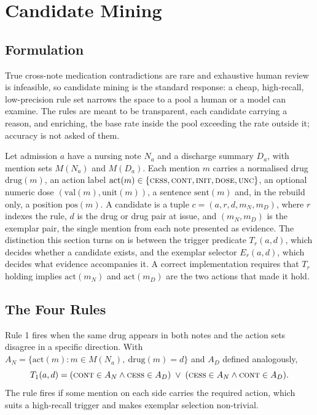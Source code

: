 \section{Candidate Mining}
\label{sec:m-candidates}

\subsection{Formulation}

True cross-note medication contradictions are rare and exhaustive human review is
infeasible, so candidate mining is the standard response: a cheap, high-recall, low-precision rule set narrows the space to a pool a human or a model can examine. The rules are meant to be transparent, each candidate carrying a reason, and enriching, the base rate inside the pool exceeding the rate outside it; accuracy is not asked of them.

Let admission $a$ have a nursing note $N_a$ and a discharge summary $D_a$, with mention sets
$M(N_a)$ and $M(D_a)$. Each mention $m$ carries a normalised drug $\mathrm{drug}(m)$, an action
label $\mathrm{act}(m) \in \{\textsc{cess}, \textsc{cont}, \textsc{init}, \textsc{dose},
\textsc{unc}\}$, an optional numeric dose $(\mathrm{val}(m), \mathrm{unit}(m))$, a sentence
$\mathrm{sent}(m)$ and, in the rebuild only, a position $\mathrm{pos}(m)$. A candidate is a tuple
$c = (a, r, d, m_N, m_D)$, where $r$ indexes the rule, $d$ is the drug or drug pair at issue, and
$(m_N, m_D)$ is the exemplar pair, the single mention from each note presented as evidence. The
distinction this section turns on is between the trigger predicate $T_r(a,d)$, which decides
whether a candidate exists, and the exemplar selector $E_r(a,d)$, which decides what evidence
accompanies it. A correct implementation requires that $T_r$ holding implies $\mathrm{act}(m_N)$
and $\mathrm{act}(m_D)$ are the two actions that made it hold.

\subsection{The Four Rules}

Rule 1 fires when the same drug appears in both notes and the action sets disagree in a specific
direction. With $A_N = \{\mathrm{act}(m) : m \in M(N_a),\ \mathrm{drug}(m) = d\}$ and $A_D$ defined
analogously,
\[
T_1(a,d) =
(\textsc{cont} \in A_N \wedge \textsc{cess} \in A_D)
\;\vee\;
(\textsc{cess} \in A_N \wedge \textsc{cont} \in A_D).
\]
The rule fires if some mention on each side carries the required action, which suits a high-recall trigger and makes exemplar selection non-trivial.

